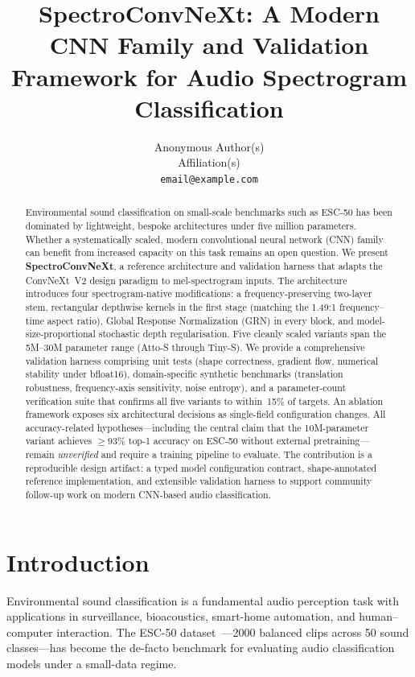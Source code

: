 \documentclass{article}
\title{SpectroConvNeXt: A Modern CNN Family and Validation Framework for Audio Spectrogram Classification}
\author{%
  Anonymous Author(s) \\
  Affiliation(s) \\
  \texttt{email@example.com} \\
}
\begin{document}
\maketitle

\begin{abstract}
Environmental sound classification on small-scale benchmarks such as ESC-50 has
been dominated by lightweight, bespoke architectures under five million
parameters. Whether a systematically scaled, modern convolutional neural network
(CNN) family can benefit from increased capacity on this task remains an open
question. We present \textbf{SpectroConvNeXt}, a reference architecture and
validation harness that adapts the ConvNeXt~V2 design paradigm to mel-spectrogram
inputs. The architecture introduces four spectrogram-native modifications: a
frequency-preserving two-layer stem, rectangular depthwise kernels in the first
stage (matching the 1.49:1 frequency--time aspect ratio), Global Response
Normalization (GRN) in every block, and model-size-proportional stochastic depth
regularisation. Five cleanly scaled variants span the 5M--30M parameter range
(Atto-S through Tiny-S). We provide a comprehensive validation harness comprising
unit tests (shape correctness, gradient flow, numerical stability under bfloat16),
domain-specific synthetic benchmarks (translation robustness, frequency-axis
sensitivity, noise entropy), and a parameter-count verification suite that
confirms all five variants to within~15\% of targets. An ablation framework
exposes six architectural decisions as single-field configuration changes. All
accuracy-related hypotheses---including the central claim that the 10M-parameter
variant achieves $\geq 93\%$ top-1 accuracy on ESC-50 without external
pretraining---remain \emph{unverified} and require a training pipeline to
evaluate. The contribution is a reproducible design artifact: a typed model
configuration contract, shape-annotated reference implementation, and extensible
validation harness to support community follow-up work on modern CNN-based audio
classification.
\end{abstract}

\section{Introduction}

Environmental sound classification is a fundamental audio perception task with
applications in surveillance, bioacoustics, smart-home automation, and
human--computer interaction. The ESC-50 dataset~\cite{piczark2015esc50}---2000
balanced clips across 50 sound classes---has become the de-facto benchmark for
evaluating audio classification models under a small-data regime.
\end{document}
